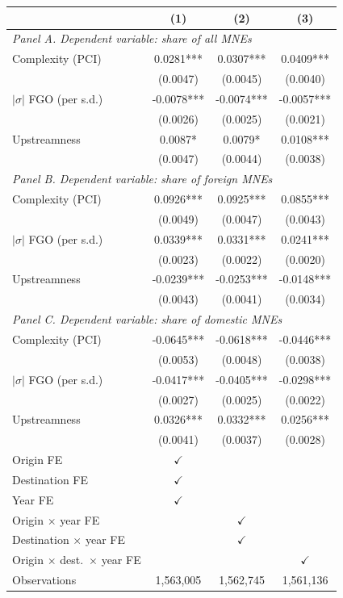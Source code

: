 \begin{tabular}{lccc} \hline
 & (1) & (2) & (3) \\ \hline
\multicolumn{4}{l}{\textit{Panel A. Dependent variable: share of all MNEs}} \\
Complexity (PCI) & 0.0281*** & 0.0307*** & 0.0409*** \\
 & (0.0047) & (0.0045) & (0.0040) \\
$|\sigma|$ FGO (per s.d.) & -0.0078*** & -0.0074*** & -0.0057*** \\
 & (0.0026) & (0.0025) & (0.0021) \\
Upstreamness & 0.0087* & 0.0079* & 0.0108*** \\
 & (0.0047) & (0.0044) & (0.0038) \\
\midrule
\multicolumn{4}{l}{\textit{Panel B. Dependent variable: share of foreign MNEs}} \\
Complexity (PCI) & 0.0926*** & 0.0925*** & 0.0855*** \\
 & (0.0049) & (0.0047) & (0.0043) \\
$|\sigma|$ FGO (per s.d.) & 0.0339*** & 0.0331*** & 0.0241*** \\
 & (0.0023) & (0.0022) & (0.0020) \\
Upstreamness & -0.0239*** & -0.0253*** & -0.0148*** \\
 & (0.0043) & (0.0041) & (0.0034) \\
\midrule
\multicolumn{4}{l}{\textit{Panel C. Dependent variable: share of domestic MNEs}} \\
Complexity (PCI) & -0.0645*** & -0.0618*** & -0.0446*** \\
 & (0.0053) & (0.0048) & (0.0038) \\
$|\sigma|$ FGO (per s.d.) & -0.0417*** & -0.0405*** & -0.0298*** \\
 & (0.0027) & (0.0025) & (0.0022) \\
Upstreamness & 0.0326*** & 0.0332*** & 0.0256*** \\
 & (0.0041) & (0.0037) & (0.0028) \\
\hline
Origin FE & $\checkmark$ &  &  \\
Destination FE & $\checkmark$ &  &  \\
Year FE & $\checkmark$ &  &  \\
Origin $\times$ year FE &  & $\checkmark$ &  \\
Destination $\times$ year FE &  & $\checkmark$ &  \\
Origin $\times$ dest.\ $\times$ year FE &  &  & $\checkmark$ \\
Observations & 1,563,005 & 1,562,745 & 1,561,136 \\
\hline
\end{tabular}
